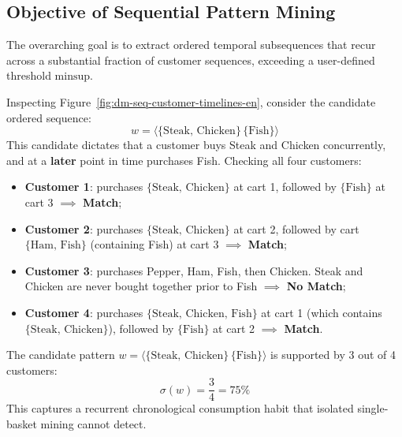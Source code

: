 \subsection{Objective of Sequential Pattern Mining}
The overarching goal is to extract ordered temporal subsequences that recur across a substantial fraction of customer sequences, exceeding a user-defined threshold $\text{minsup}$.

Inspecting Figure~\ref{fig:dm-seq-customer-timelines-en}, consider the candidate ordered sequence:
\begin{equation}
\label{eq:seq-candidate-steak-fish-en}
w = \langle \{\text{Steak, Chicken}\} \, \{\text{Fish}\} \rangle
\end{equation}
This candidate dictates that a customer buys Steak and Chicken concurrently, and at a \textbf{later} point in time purchases Fish.
Checking all four customers:
\begin{itemize}
    \item \textbf{Customer 1}: purchases $\{\text{Steak, Chicken}\}$ at cart 1, followed by $\{\text{Fish}\}$ at cart 3 $\implies$ \textbf{Match};
    \item \textbf{Customer 2}: purchases $\{\text{Steak, Chicken}\}$ at cart 2, followed by cart $\{\text{Ham, Fish}\}$ (containing Fish) at cart 3 $\implies$ \textbf{Match};
    \item \textbf{Customer 3}: purchases Pepper, Ham, Fish, then Chicken. Steak and Chicken are never bought together prior to Fish $\implies$ \textbf{No Match};
    \item \textbf{Customer 4}: purchases $\{\text{Steak, Chicken, Fish}\}$ at cart 1 (which contains $\{\text{Steak, Chicken}\}$), followed by $\{\text{Fish}\}$ at cart 2 $\implies$ \textbf{Match}.
\end{itemize}

The candidate pattern $w = \langle \{\text{Steak, Chicken}\} \, \{\text{Fish}\} \rangle$ is supported by 3 out of 4 customers:
\begin{equation}
\sigma(w) = \frac{3}{4} = 75\%
\end{equation}
This captures a recurrent chronological consumption habit that isolated single-basket mining cannot detect.

